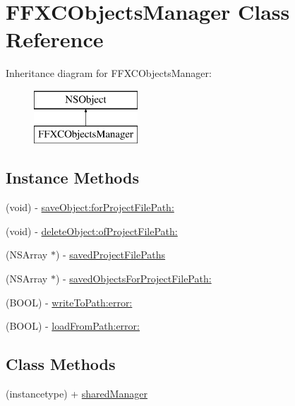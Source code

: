 \hypertarget{interface_f_f_x_c_objects_manager}{\section{F\-F\-X\-C\-Objects\-Manager Class Reference}
\label{interface_f_f_x_c_objects_manager}
}
Inheritance diagram for F\-F\-X\-C\-Objects\-Manager\-:\begin{figure}[H]
\begin{center}
\leavevmode
\includegraphics[height=2.000000cm]{interface_f_f_x_c_objects_manager}
\end{center}
\end{figure}
\subsection*{Instance Methods}
\begin{DoxyCompactItemize}
\item 
(void) -\/ \hyperlink{interface_f_f_x_c_objects_manager_addb50732d8e5600dddcf705502c74660}{save\-Object\-:for\-Project\-File\-Path\-:}
\item 
(void) -\/ \hyperlink{interface_f_f_x_c_objects_manager_a0155ebd7970eead6cc3aa7a0f0a0cb14}{delete\-Object\-:of\-Project\-File\-Path\-:}
\item 
(N\-S\-Array $\ast$) -\/ \hyperlink{interface_f_f_x_c_objects_manager_ae0812eb290de2871f745561d5ee075b1}{saved\-Project\-File\-Paths}
\item 
(N\-S\-Array $\ast$) -\/ \hyperlink{interface_f_f_x_c_objects_manager_aa3f1390ed21c28d3747ae42975799659}{saved\-Objects\-For\-Project\-File\-Path\-:}
\item 
(B\-O\-O\-L) -\/ \hyperlink{interface_f_f_x_c_objects_manager_a9235f6edcfcb7cd8e9538f7e58e2b940}{write\-To\-Path\-:error\-:}
\item 
(B\-O\-O\-L) -\/ \hyperlink{interface_f_f_x_c_objects_manager_a279009acd03a26c48b2c6d7967d2cbbf}{load\-From\-Path\-:error\-:}
\end{DoxyCompactItemize}
\subsection*{Class Methods}
\begin{DoxyCompactItemize}
\item 
(instancetype) + \hyperlink{interface_f_f_x_c_objects_manager_a84882e4d61f22f51a18d3b639d881138}{shared\-Manager}
\end{DoxyCompactItemize}
